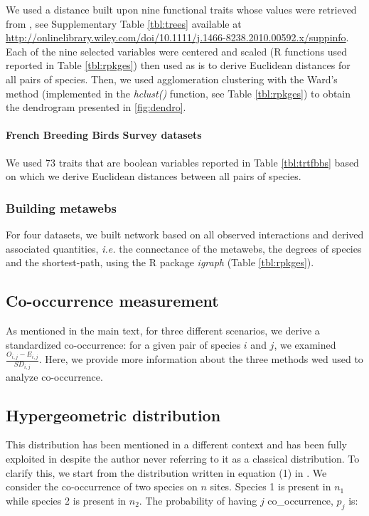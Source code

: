 We used a distance built upon nine functional traits whose values were
retrieved from \citep{Paquette2011}, see Supplementary Table
\ref{tbl:trees} available at
\url{http://onlinelibrary.wiley.com/doi/10.1111/j.1466-8238.2010.00592.x/suppinfo}.
Each of the nine selected variables were centered and scaled (R
functions used reported in Table \ref{tbl:rpkges}) then used as is to
derive Euclidean distances for all pairs of species. Then, we used
agglomeration clustering with the Ward's method (implemented in the
\emph{hclust()} function, see Table \ref{tbl:rpkges}) to obtain the
dendrogram presented in \ref{fig:dendro}.

\paragraph{French Breeding Birds Survey
datasets}\label{french-breeding-birds-survey-datasets}

We used 73 traits that are boolean variables reported in Table
\ref{tbl:trtfbbs} based on which we derive Euclidean distances between
all pairs of species.

\subsubsection{Building metawebs}\label{building-metawebs}

For four datasets, we built network based on all observed interactions
and derived associated quantities, \emph{i.e.} the connectance of the
metawebs, the degrees of species and the shortest-path, using the R
package \emph{igraph} (Table \ref{tbl:rpkges}).

\subsection{Co-occurrence measurement}\label{co-occurrence-measurement}

As mentioned in the main text, for three different scenarios, we derive
a standardized co-occurrence: for a given pair of species \(i\) and
\(j\), we examined \(\frac{O_{i,j}-E_{i,j}}{SD_{i,j}}\). Here, we
provide more information about the three methods wed used to analyze
co-occurrence.

\subsection{Hypergeometric
distribution}\label{hypergeometric-distribution}

This distribution has been mentioned in a different context
\citep[see][]{Gilpin1982} and has been fully exploited in
\citet{Veech2013} despite the author never referring to it as a
classical distribution. To clarify this, we start from the distribution
written in equation (1) in \citet{Veech2013}. We consider the
co-occurrence of two species on \(n\) sites. Species 1 is present in
\(n_1\) while species 2 is present in \(n_2\). The probability of having
\(j\) co\_occurrence, \(p_j\) is:


